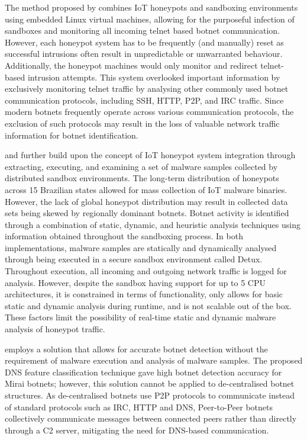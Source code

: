 The method proposed by \citep{PaPa2016} combines IoT honeypots and sandboxing environments using embedded Linux virtual machines, allowing for the purposeful infection of sandboxes and monitoring all incoming telnet based botnet communication. However, each honeypot system has to be frequently (and manually) reset as successful intrusions often result in unpredictable or unwarranted behaviour. Additionally, the honeypot machines would only monitor and redirect telnet-based intrusion attempts. This system overlooked important information by exclusively monitoring telnet traffic by analysing other commonly used botnet communication protocols, including SSH, HTTP, P2P, and IRC traffic. Since modern botnets frequently operate across various communication protocols, the exclusion of such protocols may result in the loss of valuable network traffic information for botnet identification.

\citet{Bastos2019} and \citet{Ceron2019} further build upon the concept of IoT honeypot system integration through extracting, executing, and examining a set of malware samples collected by distributed sandbox environments. The long-term distribution of honeypots across 15 Brazilian states allowed for mass collection of IoT malware binaries. However, the lack of global honeypot distribution may result in collected data sets being skewed by regionally dominant botnets. Botnet activity is identified through a combination of static, dynamic, and heuristic analysis techniques using information obtained throughout the sandboxing process. In both implementations, malware samples are statically and dynamically analysed through being executed in a secure sandbox environment called Detux. \citep{Detux2016} Throughout execution, all incoming and outgoing network traffic is logged for analysis. However, despite the sandbox having support for up to 5 CPU architectures, it is constrained in terms of functionality, only allows for basic static and dynamic analysis during runtime, and is not scalable out of the box. These factors limit the possibility of real-time static and dynamic malware analysis of honeypot traffic.

\citet{Dwyer2019} employs a solution that allows for accurate botnet detection without the requirement of malware execution and analysis of malware samples. The proposed DNS feature classification technique gave high botnet detection accuracy for Mirai botnets; however, this solution cannot be applied to de-centralised botnet structures. As de-centralised botnets use P2P protocols to communicate instead of standard protocols such as IRC, HTTP and DNS, Peer-to-Peer botnets collectively communicate messages between connected peers rather than directly through a C2 server, mitigating the need for DNS-based communication.

